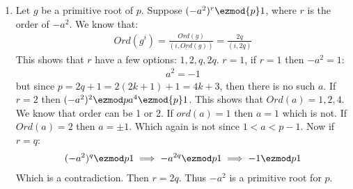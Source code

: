 \begin{enumerate}[label=]
    \item
        Let $g$ be a primitive root of $p$. Suppose $(-a^2)^r \ezmod{p} 1$, where $r$ is the order of $-a^2$. We know that:
        \begin{gather*}
            Ord(g^i) = \frac{Ord(g)}{(i, Ord(g))} = \frac{2q}{(i, 2q)}
        \end{gather*}
        This shows that $r$ have a few options: $1, 2, q, 2q$. $r = 1$, if $r = 1$ then $-a^2 = 1$:
        \begin{gather*}
            a^2 = -1 
        \end{gather*}
        but since $p = 2q + 1 = 2(2k + 1) + 1 = 4k + 3$, then there is no such $a$.
        If $r = 2$ then $(-a^2)^2 \ezmod p a^4 \ezmod{p} 1$. This shows that $Ord(a) = 1, 2, 4$. We know that order can be 1 or 2. If $ord(a) = 1$ then $a = 1$ which is not. If $Ord(a) = 2$ then $a = \pm 1$. Which again is not since $1 < a < p - 1$. Now if $r = q$:
        \begin{gather*}
            (-a^2)^q \ezmod p 1 \implies -a^{2q} \ezmod p 1 \implies -1 \ezmod p 1
        \end{gather*}
        Which is a contradiction. Then $r = 2q$. Thus $-a^2$ is a primitive root for $p$.
\end{enumerate}